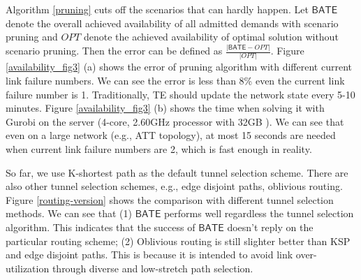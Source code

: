\documentclass[sigconf]{acmart}
\begin{document}
Algorithm \ref{pruning} cuts off the scenarios that can hardly happen.
Let $\mathsf{BATE}$ denote the overall achieved availability of all admitted demands with scenario pruning  and $OPT$ denote the achieved availability of optimal solution without scenario pruning. 
Then the error can be defined as $\frac{|\mathsf{BATE} -OPT|}{|OPT|}$.
Figure \ref{availability_fig3} (a) shows the error of pruning algorithm with different current link failure numbers.
We can see the error is less than 8\% even the current link failure number is 1.
Traditionally, TE should update the network state every 5-10 minutes.
Figure \ref{availability_fig3} (b) shows the time when solving it with Gurobi \cite{gurobi} on the server (4-core, 2.60GHz processor with 32GB ).
We can see that even on a large network (e.g., ATT topology), at most  15 seconds are needed when current link failure numbers are 2, which is fast enough in reality.

So far, we use K-shortest path as the default tunnel selection scheme.
There are also other tunnel selection schemes, e.g., edge disjoint paths\cite{Bruno2013Dynamic}, oblivious routing\cite{SMORE}.
Figure \ref{routing-version} shows the comparison with different tunnel selection methods.
We can see that (1) $\mathsf{BATE}$ performs well regardless the tunnel selection algorithm.
This indicates that the success of $\mathsf{BATE}$ doesn't reply on the particular routing scheme;
(2)  Oblivious routing is still slighter better than KSP and edge disjoint paths.
This is because it is intended to avoid link over-utilization through diverse and low-stretch path selection.
\end{document}
